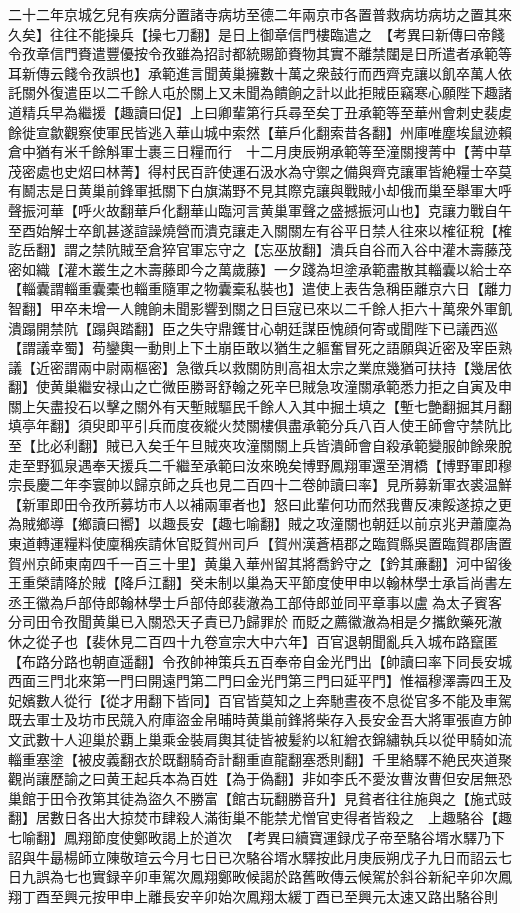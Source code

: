 二十二年京城乞兒有疾病分置諸寺病坊至德二年兩京市各置普救病坊病坊之置其來久矣】往往不能操兵【操七刀翻】是日上御章信門樓臨遣之　【考異曰新傳曰帝餞令孜章信門賚遣豐優按令孜雖為招討都統賜節賚物其實不離禁闥是日所遣者承範等耳新傳云餞令孜誤也】承範進言聞黄巢擁數十萬之衆鼓行而西齊克讓以飢卒萬人依託關外復遣臣以二千餘人屯於關上又未聞為饋餉之計以此拒賊臣竊寒心願陛下趣諸道精兵早為繼援【趣讀曰促】上曰卿輩第行兵尋至矣丁丑承範等至華州會刺史裴䖍餘徙宣歙觀察使軍民皆逃入華山城中索然【華戶化翻索昔各翻】州庫唯塵埃鼠迹賴倉中猶有米千餘斛軍士裹三日糧而行　十二月庚辰朔承範等至潼關搜菁中【菁中草茂密處也史炤曰林菁】得村民百許使運石汲水為守禦之備與齊克讓軍皆絶糧士卒莫有鬭志是日黄巢前鋒軍抵關下白旗滿野不見其際克讓與戰賊小却俄而巢至舉軍大呼聲振河華【呼火故翻華戶化翻華山臨河言黄巢軍聲之盛撼振河山也】克讓力戰自午至酉始解士卒飢甚遂諠譟燒營而潰克讓走入關關左有谷平日禁人往來以榷征稅【榷訖岳翻】謂之禁阬賊至倉猝官軍忘守之【忘巫放翻】潰兵自谷而入谷中灌木壽藤茂密如織【灌木叢生之木壽藤即今之萬歲藤】一夕踐為坦塗承範盡散其輜囊以給士卒【輜囊謂輜重囊橐也輜重隨軍之物囊槖私裝也】遣使上表告急稱臣離京六日【離力智翻】甲卒未增一人餽餉未聞影響到關之日巨寇已來以二千餘人拒六十萬衆外軍飢潰蹋開禁阬【蹋與踏翻】臣之失守鼎鑊甘心朝廷謀臣愧顔何寄或聞陛下已議西巡【謂議幸蜀】苟鑾輿一動則上下土崩臣敢以猶生之軀奮冒死之語願與近密及宰臣熟議【近密謂兩中尉兩樞密】急徵兵以救關防則高祖太宗之業庶幾猶可扶持【幾居依翻】使黄巢繼安禄山之亡微臣勝哥舒翰之死辛巳賊急攻潼關承範悉力拒之自寅及申關上矢盡投石以擊之關外有天塹賊驅民千餘人入其中掘土填之【塹七艶翻掘其月翻填亭年翻】須臾即平引兵而度夜縱火焚關樓俱盡承範分兵八百人使王師會守禁阬比至【比必利翻】賊已入矣壬午旦賊夾攻潼關關上兵皆潰師會自殺承範變服帥餘衆脫走至野狐泉遇奉天援兵二千繼至承範曰汝來晩矣博野鳳翔軍還至渭橋【博野軍即穆宗長慶二年李寰帥以歸京師之兵也見二百四十二卷帥讀曰率】見所募新軍衣裘温鮮【新軍即田令孜所募坊市人以補兩軍者也】怒曰此輩何功而然我曹反凍餒遂掠之更為賊鄉導【鄉讀曰嚮】以趣長安【趣七喻翻】賊之攻潼關也朝廷以前京兆尹蕭廩為東道轉運糧料使廩稱疾請休官貶賀州司戶【賀州漢蒼梧郡之臨賀縣吳置臨賀郡唐置賀州京師東南四千一百三十里】黄巢入華州留其將喬鈐守之【鈐其亷翻】河中留後王重榮請降於賊【降戶江翻】癸未制以巢為天平節度使甲申以翰林學士承旨尚書左丞王徽為戶部侍郎翰林學士戶部侍郎裴澈為工部侍郎並同平章事以盧為太子賓客分司田令孜聞黄巢已入關恐天子責已乃歸罪於而貶之薦徽澈為相是夕攜飲藥死澈休之從子也【裴休見二百四十九卷宣宗大中六年】百官退朝聞亂兵入城布路竄匿【布路分路也朝直遥翻】令孜帥神策兵五百奉帝自金光門出【帥讀曰率下同長安城西面三門北來第一門曰開遠門第二門曰金光門第三門曰延平門】惟福穆澤壽四王及妃嬪數人從行【從才用翻下皆同】百官皆莫知之上奔馳晝夜不息從官多不能及車駕既去軍士及坊市民競入府庫盜金帛晡時黄巢前鋒將柴存入長安金吾大將軍張直方帥文武數十人迎巢於覇上巢乘金裝肩輿其徒皆被髪約以紅繒衣錦繡執兵以從甲騎如流輜重塞塗【被皮義翻衣於既翻騎奇計翻重直龍翻塞悉則翻】千里絡驛不絶民夾道聚觀尚讓歷諭之曰黄王起兵本為百姓【為于偽翻】非如李氏不愛汝曹汝曹但安居無恐巢館于田令孜第其徒為盜久不勝富【館古玩翻勝音升】見貧者往往施與之【施式豉翻】居數日各出大掠焚市肆殺人滿街巢不能禁尤憎官吏得者皆殺之　上趣駱谷【趣七喻翻】鳳翔節度使鄭畋謁上於道次　【考異曰續寶運録戊子帝至駱谷壻水驛乃下詔與牛朂楊師立陳敬瑄云今月七日已次駱谷壻水驛按此月庚辰朔戊子九日而詔云七日九誤為七也實録辛卯車駕次鳳翔鄭畋候謁於路舊畋傳云候駕於斜谷新紀辛卯次鳳翔丁酉至興元按甲申上離長安辛卯始次鳳翔太緩丁酉已至興元太速又路出駱谷則